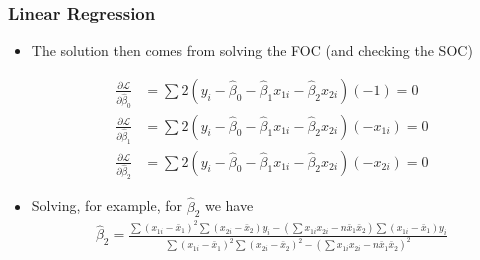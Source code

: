 \documentclass[
  shownotes,
  xcolor={svgnames},
  hyperref={colorlinks,citecolor=DarkBlue,linkcolor=andesred,urlcolor=DarkBlue}
  , aspectratio=169]{beamer}
\begin{document}
\begin{frame}
\frametitle{Linear Regression}

\begin{itemize}

\item The solution then comes from solving the FOC (and checking the SOC)

\begin{align}
\frac{\partial\mathcal{L}}{\partial\hat{\beta}_{0}}&=\sum2\left(y_{i}-\hat{\beta}_{0}-\hat{\beta}_{1}x_{1i}-\hat{\beta}_{2}x_{2i}\right)(-1)=0 \\
\frac{\partial\mathcal{L}}{\partial\hat{\beta}_{1}}&=\sum2\left(y_{i}-\hat{\beta}_{0}-\hat{\beta}_{1}x_{1i}-\hat{\beta}_{2}x_{2i}\right)(-x_{1i})=0 \\
\frac{\partial\mathcal{L}}{\partial\hat{\beta}_{2}}&=\sum2\left(y_{i}-\hat{\beta}_{0}-\hat{\beta}_{1}x_{1i}-\hat{\beta}_{2}x_{2i}\right)(-x_{2i})=0
\end{align}

\item Solving, for example, for $\hat{\beta}_2$ we have
\begin{align}
\hat{\beta}_{2}=\frac{\sum(x_{1i}-\bar{x}_{1})^{2}\sum(x_{2i}-\bar{x}_{2})y_{i}-\left( \sum x_{1i}x_{2i}-n\bar{x}_{1}\bar{x}_{2} \right)\sum(x_{1i}-\bar{x}_{1})y_{i}}{\sum(x_{1i}-\bar{x}_{1})^{2}\sum(x_{2i}-\bar{x}_{2})^{2}-\left( \sum x_{1i}x_{2i}-n\bar{x}_{1}\bar{x}_{2}\right)^{2}}
\end{align}

\end{itemize}
\end{frame}
\end{document}
